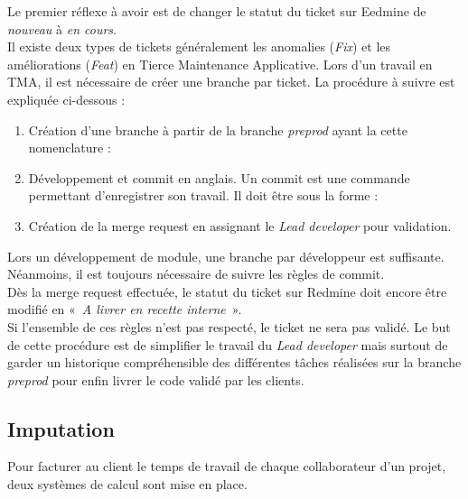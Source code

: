 \documentclass[12pt, a4paper, twoside]{report}
\begin{document}
Le premier réflexe à avoir est de changer le statut du ticket sur Eedmine de \textit{nouveau} à \textit{en cours}. \\

Il existe deux types de tickets généralement les anomalies (\textit{Fix}) et les améliorations (\textit{Feat}) en Tierce Maintenance Applicative. Lors d'un travail en TMA, il est nécessaire de créer une branche par ticket. La procédure à suivre est expliquée ci-dessous :
\begin{enumerate}
	\item Création d'une branche à partir de la branche \textit{preprod} ayant la cette nomenclature :
	
		
	\item Développement et commit en anglais. Un commit est une commande permettant d'enregistrer son travail. Il doit être sous la forme : 
	
		
	\item Création de la merge request en assignant le \textit{Lead developer} pour validation.\\
		
\end{enumerate}

Lors un développement de module, une branche par développeur est suffisante. Néanmoins, il est toujours nécessaire de suivre les règles de commit. \\

Dès la merge request effectuée, le statut du ticket sur Redmine doit encore être modifié en « \textit{A livrer en recette interne} ».  \\

Si l'ensemble de ces règles n'est pas respecté, le ticket ne sera pas validé. Le but de cette procédure est de simplifier le travail du \textit{Lead developer} mais surtout de garder un historique compréhensible des différentes tâches réalisées sur la branche \textit{preprod} pour enfin livrer le code validé par les clients.

\subsection{Imputation}

Pour facturer au client le temps de travail de chaque collaborateur d'un projet, deux systèmes de calcul sont mise en place. \\
\end{document}
